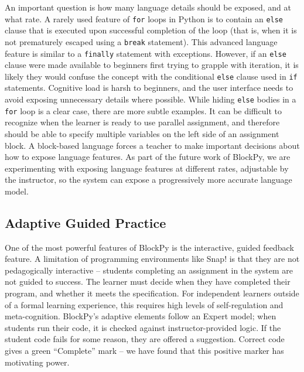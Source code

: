 \documentclass[10pt, conference, compsocconf]{IEEEtran}
\begin{document}
An important question is how many language details should be exposed, and at what rate.
A rarely used feature of \texttt{for} loops in Python is to contain an \texttt{else} clause that is executed upon successful completion of the loop (that is, when it is not prematurely escaped using a \texttt{break} statement).
This advanced language feature is similar to a \texttt{finally} statement with exceptions.
However, if an \texttt{else} clause were made available to beginners first trying to grapple with iteration, it is likely they would confuse the concept with the conditional \texttt{else} clause used in \texttt{if} statements.
Cognitive load is harsh to beginners, and the user interface needs to avoid exposing unnecessary details where possible.
While hiding \texttt{else} bodies in a \texttt{for} loop is a clear case, there are more subtle examples.
It can be difficult to recognize when the learner is ready to use parallel assignment, and therefore should be able to specify multiple variables on the left side of an assignment block.
A block-based language forces a teacher to make important decisions about how to expose language features.
As part of the future work of BlockPy, we are experimenting with exposing language features at different rates, adjustable by the instructor, so the system can expose a progressively more accurate language model.

\subsection{Adaptive Guided Practice}

One of the most powerful features of BlockPy is the interactive, guided feedback feature.
A limitation of programming environments like Snap! is that they are not pedagogically interactive --
students completing an assignment in the system are not guided to success.
The learner must decide when they have completed their program, and whether it meets the specification.
For independent learners outside of a formal learning experience, this requires high levels of self-regulation and meta-cognition.
BlockPy's adaptive elements follow an Expert model; when students run their code, it is checked against instructor-provided logic.
If the student code fails for some reason, they are offered a suggestion.
Correct code gives a green ``Complete'' mark -- we have found that this positive marker has motivating power.
\end{document}
